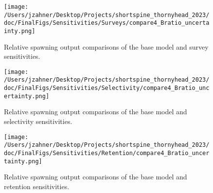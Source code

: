 \documentclass[11pt,
  english,
  letterpaper,
]{article}
\begin{document}
\begin{figure}
\centering
\texttt{[image: /Users/jzahner/Desktop/Projects/shortspine\_thornyhead\_2023/doc/FinalFigs/Sensitivities/Surveys/compare4\_Bratio\_uncertainty.png]}
\caption{Relative spawning output comparisons of the base model and survey sensitivities.\label{fig:surv_sensitiv_mngmt}}
\end{figure}

\begin{figure}
\centering
\texttt{[image: /Users/jzahner/Desktop/Projects/shortspine\_thornyhead\_2023/doc/FinalFigs/Sensitivities/Selectivity/compare4\_Bratio\_uncertainty.png]}
\caption{Relative spawning output comparisons of the base model and selectivity sensitivities.\label{fig:selec_sensitiv_mngmt}}
\end{figure}

\begin{figure}
\centering
\texttt{[image: /Users/jzahner/Desktop/Projects/shortspine\_thornyhead\_2023/doc/FinalFigs/Sensitivities/Retention/compare4\_Bratio\_uncertainty.png]}
\caption{Relative spawning output comparisons of the base model and retention sensitivities.\label{fig:reten_sensitiv_mngmt}}
\end{figure}
\end{document}
